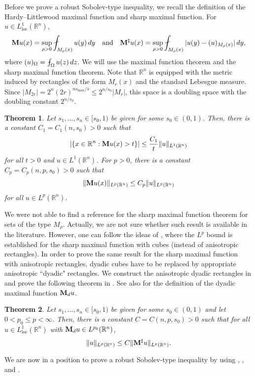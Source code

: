 \documentclass[11pt]{amsart}
\theoremstyle{plain}
\newtheorem{theorem}{Theorem}[section]
\theoremstyle{definition}
\numberwithin{equation}{section}
\renewcommand{\d}{\textnormal{d}}
\begin{document}
Before we prove a robust Sobolev-type inequality, we recall the definition of the Hardy--Littlewood maximal function and sharp maximal function. For $u \in L^1_{\mathrm{loc}}(\mathbb{R}^n)$,
\begin{equation*}
{\bf M}u(x) = \sup_{\rho > 0} \fint_{M_\rho(x)} u(y) \,\d y \quad\text{and}\quad {\bf M}^{\sharp}u(x) = \sup_{\rho > 0} \fint_{M_\rho(x)} |u(y) - (u)_{M_{\rho}(x)}| \,\d y,
\end{equation*}
where $(u)_\Omega = \fint_\Omega u(z)\,\d z$. We will use the maximal function theorem and the sharp maximal function theorem. Note that $\mathbb{R}^n$ is equipped with the metric induced by rectangles of the form $M_r(x)$ and the standard Lebesgue measure. Since $|M_{2r}| = 2^n (2r)^{ns_{\max}/\bar{s}} \leq 2^{n/s_0} |M_r|$, this space is a doubling space with the doubling constant $2^{n/s_0}$.
\begin{theorem} \cite[Theorem 2.2]{Hein01} \label{thm:maximal}
Let $s_1, \dots, s_n \in [s_0, 1)$ be given for some $s_0 \in (0,1)$. Then, there is a constant $C_1 = C_1(n, s_0) > 0$ such that
\begin{equation*}
|\lbrace x \in \mathbb{R}^n : {\bf M}u(x) > t \rbrace| \leq \frac{C_1}{t} \|u\|_{L^1(\mathbb{R}^n)}
\end{equation*}
for all $t > 0$ and $u \in L^1(\mathbb{R}^n)$. For $p > 0$, there is a constant $C_p = C_p(n, p, s_0) > 0$ such that
\begin{equation*}
\|{\bf M}u(x)\|_{L^p(\mathbb{R}^n)} \leq C_p \|u\|_{L^p(\mathbb{R}^n)}
\end{equation*}
for all $u \in L^p(\mathbb{R}^n)$.
\end{theorem}

We were not able to find a reference for the sharp maximal function theorem for sets of the type $M_{\rho}$. Actually, we are not sure whether such result is available in the literature. However, one can follow the ideas of \cite[Section 3.4]{GrafakosMF}, where the $L^p$ bound is established for the sharp maximal function with cubes (instead of anisotropic rectangles). In order to prove the same result for the sharp maximal function with anisotropic rectangles, dyadic cubes have to be replaced by appropriate anisotropic ``dyadic" rectangles. We construct the anisotropic dyadic rectangles in  and prove the following theorem in . See also  for the definition of the dyadic maximal function ${\bf M}_d u$.
\begin{theorem} \label{thm:sharp_maximal}
Let $s_1, \dots, s_n \in [s_0, 1)$ be given for some $s_0 \in (0,1)$ and let $0 < p_0 \leq p < \infty$. Then, there is a constant $C = C(n, p, s_0) > 0$ such that for all $u \in L^1_{\mathrm{loc}}(\mathbb{R}^n)$ with ${\bf M}_du \in L^{p_0}(\mathbb{R}^n)$,
\begin{equation*}
\|u\|_{L^p(\mathbb{R}^n)} \leq C \|{\bf M}^{\sharp}u\|_{L^p(\mathbb{R}^n)}.
\end{equation*}
\end{theorem}
We are now in a position to prove a robust Sobolev-type inequality by using , , and .
\end{document}
